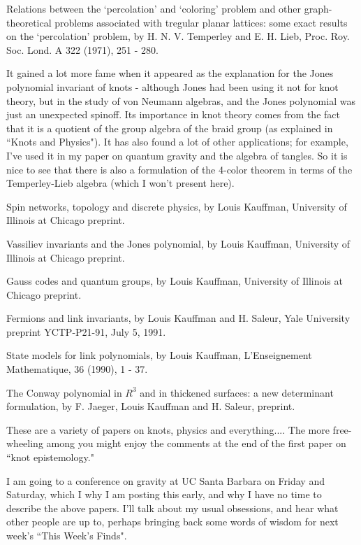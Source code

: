 Relations between the `percolation' and `coloring' problem and other graph-theoretical problems associated with tregular planar lattices: some exact results on the `percolation' problem, by H. N. V. Temperley and E. H. Lieb, Proc. Roy. Soc. Lond. A 322 (1971), 251 - 280.

It gained a lot more fame when it appeared as the explanation for the Jones polynomial invariant of knots - although Jones had been using it not for knot theory, but in the study of von Neumann algebras, and the Jones polynomial was just an unexpected spinoff. Its importance in knot theory comes from the fact that it is a quotient of the group algebra of the braid group (as explained in ``Knots and Physics"). It has also found a lot of other applications; for example, I've used it in my paper on quantum gravity and the algebra of tangles. So it is nice to see that there is also a formulation of the 4-color theorem in terms of the Temperley-Lieb algebra (which I won't present here).


Spin networks, topology and discrete physics, by Louis Kauffman, University of Illinois at Chicago preprint.

Vassiliev invariants and the Jones polynomial, by Louis Kauffman, University of Illinois at Chicago preprint.

Gauss codes and quantum groups, by Louis Kauffman, University of Illinois at Chicago preprint.

Fermions and link invariants, by Louis Kauffman and H. Saleur, Yale University preprint YCTP-P21-91, July 5, 1991.

State models for link polynomials, by Louis Kauffman, L'Enseignement Mathematique, 36 (1990), 1 - 37.

The Conway polynomial in $R^3$ and in thickened surfaces: a new determinant formulation, by F. Jaeger, Louis Kauffman and H. Saleur, preprint.

These are a variety of papers on knots, physics and everything.... The more free-wheeling among you might enjoy the comments at the end of the first paper on ``knot epistemology."

I am going to a conference on gravity at UC Santa Barbara on Friday and Saturday, which I why I am posting this early, and why I have no time to describe the above papers. I'll talk about my usual obsessions, and hear what other people are up to, perhaps bringing back some words of wisdom for next week's ``This Week's Finds". 
